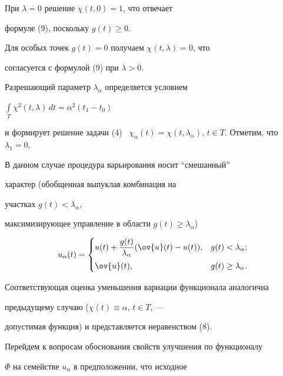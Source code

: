 При $\lambda = 0$ решение $\chi(t, 0) = 1$, что отвечает


формуле (9), поскольку $g(t) \geq 0$.





Для особых точек $g(t) = 0$ получаем $\chi(t, \lambda) = 0$, что


согласуется с формулой (9) при $\lambda > 0$.





Разрешающий параметр $\lambda_{\alpha}$ определяется условием


$\int\limits_{T} \chi^{2}(t, \lambda)\,dt = \alpha^{2}(t_{1} - t_{0})$


и формирует решение задачи (4) \ $\chi_{\alpha}(t) = \chi(t,


\lambda_{\alpha})$, $t \in T$. Отметим, что $\lambda_{1} = 0$.


В данном случае процедура варьирования носит ``смешанный'' 


характер (обобщенная выпуклая комбинация на 


участках $g(t)< \lambda_{\alpha}$, 


максимизирующее управление в области $g(t)\geq \lambda_{\alpha}$)


\begin{equation}


u_{\alpha}(t) =


\begin{cases}


u(t) + \dfrac{g(t)}{\lambda_{\alpha}}(\ov{u}(t) - u(t)),


& g(t) < \lambda_{\alpha}; \\[3mm]


\ov{u}(t), & g(t) \geq \lambda_{\alpha}.


\end{cases}


\end{equation}


Соответствующая оценка уменьшения вариации функционала аналогична


предыдущему случаю ($\chi(t) \equiv \alpha$, $t \in T$, ---


допустимая функция) и представляется неравенством (8).





Перейдем к вопросам обоснования свойств улучшения по функционалу


$\Phi$ на семействе $u_{\alpha}$ в предположении, что исходное


